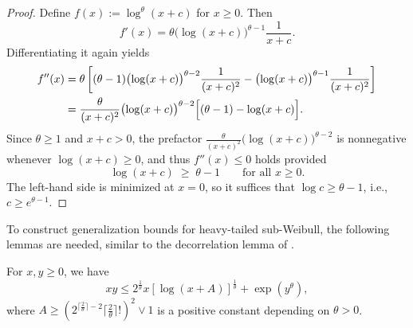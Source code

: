 \documentclass[11pt]{article}
\begin{document}
\begin{proof}
Define $f(x):=\log^\theta(x+c)$ for $x\ge 0$. Then
\[
f'(x)=\theta \bigl(\log(x+c)\bigr)^{\theta-1}\frac{1}{x+c}.
\]
Differentiating it again yields
\[
\begin{aligned}
f''(x)
&=\theta\left[
(\theta-1)\bigl(\log(x+c)\bigr)^{\theta-2}\frac{1}{(x+c)^2}
-\bigl(\log(x+c)\bigr)^{\theta-1}\frac{1}{(x+c)^2}
\right]\\
&=\frac{\theta}{(x+c)^2}\bigl(\log(x+c)\bigr)^{\theta-2}\Bigl[(\theta-1)-\log(x+c)\Bigr].
\end{aligned}
\]
Since $\theta\ge 1$ and $x+c>0$, the prefactor $\frac{\theta}{(x+c)^2}\bigl(\log(x+c)\bigr)^{\theta-2}$ is nonnegative whenever $\log(x+c)\ge 0$, and thus $f''(x)\le 0$ holds provided
\[
\log(x+c)\;\ge\;\theta-1\qquad \text{for all }x\ge 0.
\]
The left-hand side is minimized at $x=0$, so it suffices that $\log c \ge \theta-1$, i.e., $c\ge e^{\theta-1}$.
\end{proof}



To construct generalization bounds for heavy-tailed sub-Weibull, the following lemmas are needed, similar to the decorrelation lemma of \cite{chu2023unified}.

\begin{lemma}\label{young}
For $x, y \ge 0$, we have
\[
xy \leq 2^{\frac{1}{\theta}} x [\log(x + A)]^{\frac{1}{\theta}} + \exp(y^\theta),
\]
where $A\ge (2^{\lceil \frac{2}{\theta} \rceil-2} \lceil \frac{2}{\theta} \rceil !)^2 \vee 1$ is a positive constant depending on $\theta>0$.
\end{lemma}
\end{document}
